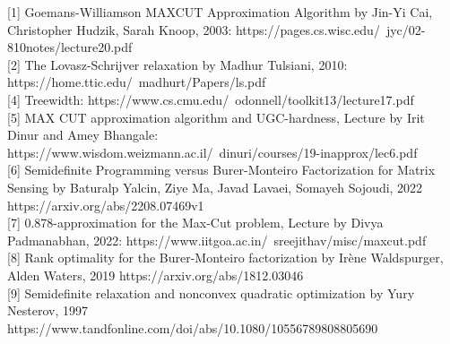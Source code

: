 \documentclass{article}
\begin{document}







[1] Goemans-Williamson MAXCUT Approximation Algorithm by Jin-Yi Cai, Christopher Hudzik, Sarah Knoop, 2003:
https://pages.cs.wisc.edu/~jyc/02-810notes/lecture20.pdf \\

[2] The Lovasz-Schrijver relaxation by Madhur Tulsiani, 2010: 
https://home.ttic.edu/~madhurt/Papers/ls.pdf \\


[4] Treewidth: 
https://www.cs.cmu.edu/~odonnell/toolkit13/lecture17.pdf\\

[5] MAX CUT approximation algorithm and UGC-hardness, Lecture by Irit Dinur and Amey Bhangale:
https://www.wisdom.weizmann.ac.il/~dinuri/courses/19-inapprox/lec6.pdf \\

[6] Semidefinite Programming versus Burer-Monteiro Factorization for Matrix
Sensing by Baturalp Yalcin, Ziye Ma, Javad Lavaei, Somayeh Sojoudi, 2022
https://arxiv.org/abs/2208.07469v1\\

[7] 0.878-approximation for the Max-Cut problem, Lecture by Divya Padmanabhan, 2022: https://www.iitgoa.ac.in/~sreejithav/misc/maxcut.pdf\\

[8] Rank optimality for the Burer-Monteiro factorization by Irène Waldspurger, Alden Waters, 2019 
https://arxiv.org/abs/1812.03046\\

[9] Semidefinite relaxation and nonconvex quadratic optimization by Yury Nesterov, 1997
https://www.tandfonline.com/doi/abs/10.1080/10556789808805690\\
\end{document}
